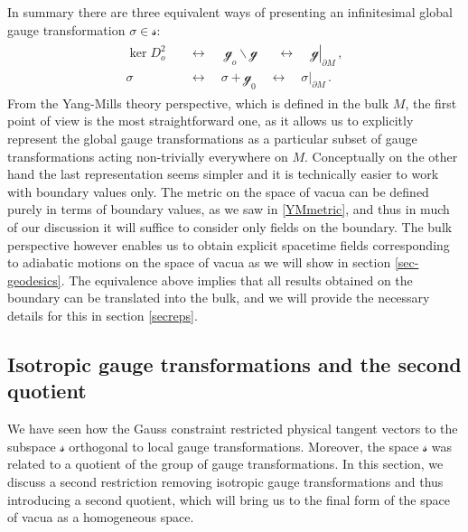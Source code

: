 \documentclass[11pt,a4paper]{article}
\def\calsg{{\boldsymbol{\mathscr g}}}
\def\calss{{\boldsymbol{\mathscr s}}}
\begin{document}
    In summary there are three equivalent ways of presenting an infinitesimal global gauge transformation $\sigma \in \calss$:
    \begin{align}
    \begin{split}
    \ker D_o^2&\quad\leftrightarrow\quad\;\calsg_o\!\backslash \calsg\;\;\quad\leftrightarrow\,\quad\left.\calsg\right|_{\partial M}\,,\\
    \sigma\quad&\quad\leftrightarrow\quad\sigma+\calsg_0\quad\leftrightarrow\quad \left.{\sigma}\right|_{\partial M}\,.
    \end{split}
    \end{align} 
    From the Yang-Mills theory perspective, which is defined in the bulk $M$, the first point of view is the most straightforward one, as it allows us to explicitly represent the global gauge transformations as a particular subset of gauge transformations acting non-trivially everywhere on $M$. Conceptually on the other hand the last representation seems simpler and it is technically easier to work with boundary values only. The metric on the space of vacua can be defined purely in terms of boundary values, as we saw in \eqref{YMmetric}, and thus in much of our discussion it will suffice to consider only fields on the boundary. The bulk perspective however enables us to obtain explicit spacetime fields corresponding to adiabatic motions on the space of vacua as we will show in section \ref{sec-geodesics}.  The equivalence above implies that all results obtained on the boundary can be translated into the bulk, and we will provide the necessary details for this in section \ref{secreps}.
    
   
    
    \subsection{Isotropic gauge transformations and the second quotient}\label{isosec}
    We have seen how the Gauss constraint restricted physical tangent vectors to the subspace $\calss$ orthogonal to local gauge transformations. Moreover, the space $\calss$ was related to a quotient of the group of gauge transformations. In this section, we discuss a second restriction removing isotropic gauge transformations and thus introducing a second quotient, which will bring us to the final form of the space of vacua as a homogeneous space.
    
\end{document}
